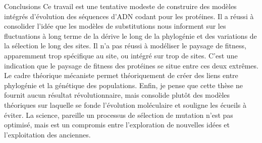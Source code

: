 Conclusions
Ce travail est une tentative modeste de construire des modèles intégrés d’évolution des séquences d'ADN codant pour les protéines.
Il a réussi à consolider l'idée que les modèles de substitutions nous informent sur les fluctuations à long terme de la dérive le long de la phylogénie et des variations de la sélection le long des sites.
Il n'a pas réussi à modéliser le paysage de fitness, apparemment trop spécifique au site, ou intégré sur trop de sites.
C'est une indication que le paysage de fitness des protéines se situe entre ces deux extrêmes.
Le cadre théorique mécaniste permet théoriquement de créer des liens entre phylogénie et la génétique des populations.
Enfin, je pense que cette thèse ne fournit aucun résultat révolutionnaire, mais consolide plutôt des modèles théoriques sur laquelle se fonde l'évolution moléculaire et souligne les écueils à éviter.
La science, pareille un processus de sélection de mutation n'est pas optimisé, mais est un compromis entre l'exploration de nouvelles idées et l'exploitation des anciennes.


